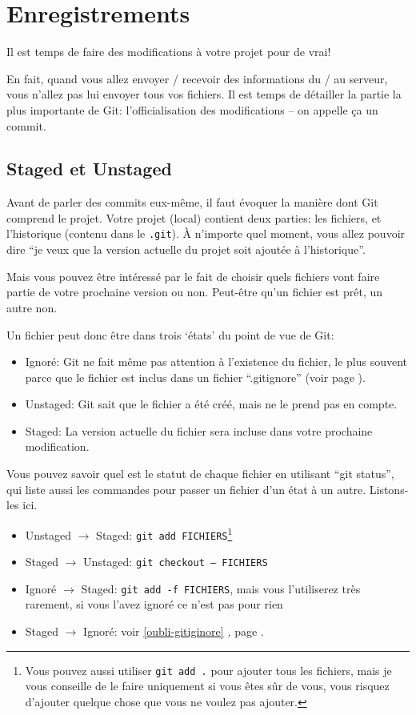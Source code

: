 \documentclass[10pt,a4paper]{article}
\begin{document}
\section{Enregistrements}

Il est temps de faire des modifications à votre projet pour de vrai!

En fait, quand vous allez envoyer / recevoir des informations du / au serveur, vous n'allez pas lui envoyer tous vos fichiers. Il est temps de détailler la partie la plus importante de Git: l'officialisation des modifications -- on appelle ça un commit.

\subsection{Staged et Unstaged}

Avant de parler des commits eux-même, il faut évoquer la manière dont Git comprend le projet. Votre projet (local) contient deux parties: les fichiers, et l'historique (contenu dans le {\tt .git}). À n'importe quel moment, vous allez pouvoir dire ``je veux que la version actuelle du projet soit ajoutée à l'historique''.

Mais vous pouvez être intéressé par le fait de choisir quels fichiers vont faire partie de votre prochaine version ou non. Peut-être qu'un fichier est prêt, un autre non.

Un fichier peut donc être dans trois `états' du point de vue de Git:

\begin{itemize}
\item Ignoré: Git ne fait même pas attention à l'existence du fichier, le plus souvent parce que le fichier est inclus dans un fichier ``.gitignore'' (voir page \pageref{gitignore}).
\item Unstaged: Git sait que le fichier a été créé, mais ne le prend pas en compte.
\item Staged: La version actuelle du fichier sera incluse dans votre prochaine modification.
\end{itemize}

Vous pouvez savoir quel est le statut de chaque fichier en utilisant ``git status'', qui liste aussi les commandes pour passer un fichier d'un état à un autre. Listons-les ici.

\begin{itemize}
\item Unstaged $\rightarrow$ Staged: \texttt{git add FICHIERS}\footnote{Vous pouvez aussi utiliser {\tt git add .} pour ajouter tous les fichiers, mais je vous conseille de le faire uniquement si vous êtes sûr de vous, vous risquez d'ajouter quelque chose que vous ne voulez pas ajouter.}
\item Staged $\rightarrow$ Unstaged: \texttt{git checkout -- FICHIERS}
\item Ignoré $\rightarrow$ Staged: \texttt{git add -f FICHIERS}, mais vous l'utiliserez très rarement, si vous l'avez ignoré ce n'est pas pour rien
\item Staged $\rightarrow$ Ignoré: voir \ref{oubli-gitiginore} \textit{,} page \pageref{oubli-gitiginore}.
\end{itemize}
\end{document}
